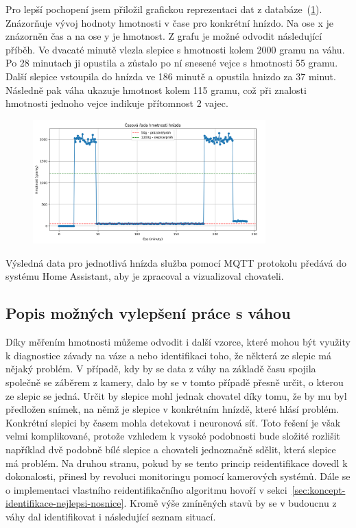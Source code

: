 Pro lepší pochopení jsem přiložil grafickou reprezentaci dat z databáze~(\ref{fig:weight_egg_chart_timeline}).
Znázorňuje vývoj hodnoty hmotnosti v čase pro konkrétní hnízdo.
Na ose x je znázorněn čas a na ose y je hmotnost.
Z grafu je možné odvodit následující příběh.
Ve dvacaté minutě vlezla slepice s hmotnosti kolem 2000 gramu na váhu.
Po 28 minutach ji opustila a zůstalo po ní snesené vejce s hmotnosti 55 gramu.
Další slepice vstoupila do hnízda ve 186 minutě a opustila hnizdo za 37 minut.
Následně pak váha ukazuje hmotnost kolem 115 gramu, což při znalosti hmotnosti jednoho vejce indikuje přítomnost 2 vajec.


\begin{figure}[h]
    \centering
    \includegraphics[width=0.8\textwidth]{img/weight_egg_chart_timeline}
    \label{fig:weight_egg_chart_timeline}
\end{figure}

Výsledná data pro jednotlivá hnízda služba pomocí MQTT protokolu předává do systému Home Assistant, aby je zpracoval a vizualizoval chovateli.\newline


\subsection*{Popis možných vylepšení práce s váhou}
Díky měřením hmotnosti můžeme odvodit i další vzorce, které mohou být využity k diagnostice závady na váze a nebo identifikaci toho, že některá ze slepic má nějaký problém.
V případě, kdy by se data z váhy na základě času spojila společně se záběrem z kamery, dalo by se v tomto případě přesně určit, o kterou ze slepic se jedná. \newline
Určit by slepice mohl jednak chovatel díky tomu, že by mu byl předložen snímek, na němž je slepice v konkrétním hnízdě, které hlásí problém.
Konkrétní slepici by časem mohla detekovat i neuronová síť. \newline
Toto řešení je však velmi komplikované, protože vzhledem k vysoké podobnosti bude složité rozlišit například dvě podobně bílé slepice a chovateli jednoznačně sdělit, která slepice má problém.
Na druhou stranu, pokud by se tento princip reidentifikace dovedl k dokonalosti, přinesl by revoluci monitoringu pomocí kamerových systémů.
Dále se o implementaci vlastního reidentifikačního algoritmu hovoří v sekci~\ref{sec:koncept-identifikace-nejlepsi-nosnice}.
\newline
Kromě výše zmíněných stavů by se v budoucnu z váhy dal identifikovat i následující seznam situací.

